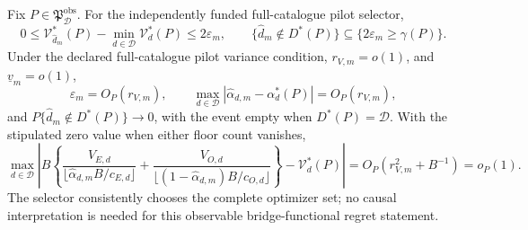 Fix \(P\in\mathfrak P_{\mathcal D}^{\mathrm{obs}}\). For the independently funded full-catalogue pilot selector,
\[
0\le\mathcal V_{\widehat d_m}^*(P)-\min_{d\in\mathcal D}\mathcal V_d^*(P)\le2\varepsilon_m,
\qquad
\{\widehat d_m\notin D^*(P)\}\subseteq\{2\varepsilon_m\ge\gamma(P)\}.
\]
Under the declared full-catalogue pilot variance condition, \(r_{V,m}=o(1)\), and \(\underline v_m=o(1)\),
\[
\varepsilon_m=O_P(r_{V,m}),
\qquad
\max_{d\in\mathcal D}|\widehat\alpha_{d,m}-\alpha_d^*(P)|=O_P(r_{V,m}),
\]
and \(P\{\widehat d_m\notin D^*(P)\}\to0\), with the event empty when \(D^*(P)=\mathcal D\). With the stipulated zero value when either floor count vanishes,
\[
\max_{d\in\mathcal D}\left|B\left\{
\frac{V_{E,d}}{\lfloor\widehat\alpha_{d,m}B/c_{E,d}\rfloor}
+\frac{V_{O,d}}{\lfloor(1-\widehat\alpha_{d,m})B/c_{O,d}\rfloor}
\right\}-\mathcal V_d^*(P)\right|
=O_P(r_{V,m}^2+B^{-1})=o_P(1).
\]
The selector consistently chooses the complete optimizer set; no causal interpretation is needed for this observable bridge-functional regret statement.